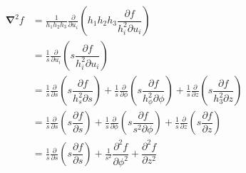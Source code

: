 \begin{align}
    \boldsymbol{\nabla}^2{f}&=\frac{1}{h_1 h_2 h_3}\frac{\partial}{\partial u_i}\left(h_1 h_2 h_3\dfrac{{\partial f}}{h_i^2\partial u_i}\right)\nonumber\\
    &=\frac{1}{s}\frac{\partial}{\partial u_i}\left(s\dfrac{{\partial f}}{h_i^2\partial u_i}\right)\nonumber\\
    &=\frac{1}{s}\frac{\partial}{\partial s}\left(s\dfrac{{\partial f}}{h_s^2\partial s}\right)
    +\frac{1}{s}\frac{\partial}{\partial \phi}\left(s\dfrac{{\partial f}}{h_{\phi}^2\partial \phi}\right)
    +\frac{1}{s}\frac{\partial}{\partial z}\left(s\dfrac{{\partial f}}{h_3^2\partial z}\right)\nonumber\\
    &=\frac{1}{s}\frac{\partial}{\partial s}\left(s\dfrac{{\partial f}}{\partial s}\right)
    +\frac{1}{s}\frac{\partial}{\partial \phi}\left(s\dfrac{{\partial f}}{s^2\partial \phi}\right)
    +\frac{1}{s}\frac{\partial}{\partial z}\left(s\dfrac{{\partial f}}{\partial z}\right)\nonumber\\
    &=\frac{1}{s}\frac{\partial}{\partial s}\left(s\dfrac{{\partial f}}{\partial s}\right)
    +\frac{1}{s^2}\dfrac{{\partial^2 f}}{\partial \phi^2}
    +\dfrac{{\partial^2 f}}{\partial z^2}
\end{align}
